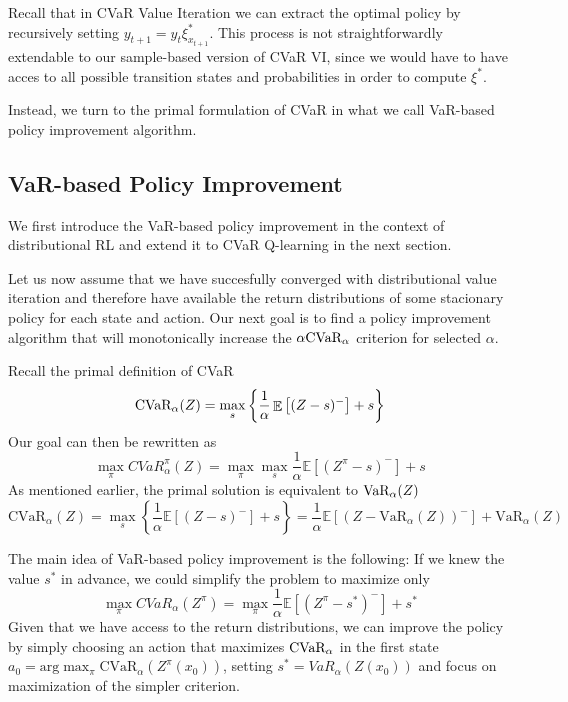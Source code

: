 Recall that in CVaR Value Iteration we can extract the optimal policy by recursively setting $y_{t+1}=y_t \xi^*_{x_{t+1}}$. This process is not straightforwardly extendable to our sample-based version of CVaR VI, since we would have to have acces to all possible transition states and probabilities in order to compute $\xi^*$.

Instead, we turn to the primal formulation of CVaR in what we call VaR-based policy improvement algorithm.

\subsection{VaR-based Policy Improvement}

We first introduce the VaR-based policy improvement in the context of distributional RL and extend it to CVaR Q-learning in the next section.

Let us now assume that we have succesfully converged with distributional value iteration and therefore have available the return distributions of some stacionary policy for each state and action. Our next goal is to find a policy improvement algorithm that will monotonically increase the $\alpha\text{CVaR}_\alpha$ criterion for selected $\alpha$.

Recall the primal definition of CVaR 
\begin{equation*}
\text{CVaR}_\alpha(Z)=
\max_s\left\lbrace \dfrac{1}{\alpha}\mathop{\mathbb{E}}
\left[ (Z-s)^-\right] + s  \right\rbrace 
\end{equation*}
Our goal  can then be rewritten as
\begin{equation*}
\max_\pi CVaR_\alpha^\pi(Z) = \max_\pi \max_s \dfrac{1}{\alpha}\mathbb{E}
\left[ (Z^\pi-s)^-\right] + s
\end{equation*}
As mentioned earlier, the primal solution is equivalent to $\text{VaR}_\alpha(Z)$
\begin{equation*}
\text{CVaR}_\alpha(Z)=
\max_s\left\lbrace \dfrac{1}{\alpha}\mathbb{E}
\left[ (Z-s)^-\right] + s  \right\rbrace =\dfrac{1}{\alpha}\mathbb{E}
\left[ (Z - \text{VaR}_\alpha(Z))^-\right] + \text{VaR}_\alpha(Z) 
\end{equation*}

The main idea of VaR-based policy improvement is the following: If we knew the value $s^*$ in advance, we could simplify the problem to maximize only
\begin{equation}\label{eqn:varbasedgoal}
\max_\pi CVaR_\alpha(Z^\pi) = \max_\pi \dfrac{1}{\alpha}\mathbb{E}
\left[ (Z^\pi-s^*)^-\right] + s^*
\end{equation}
Given that we have access to the return distributions, we can improve the policy by simply choosing an action that maximizes $\text{CVaR}_\alpha$ in the first state $a_0 = \text{arg}\max_\pi\text{CVaR}_\alpha(Z^\pi(x_0))$, setting $s^* = VaR_\alpha(Z(x_0))$ and focus on maximization of the simpler criterion.

